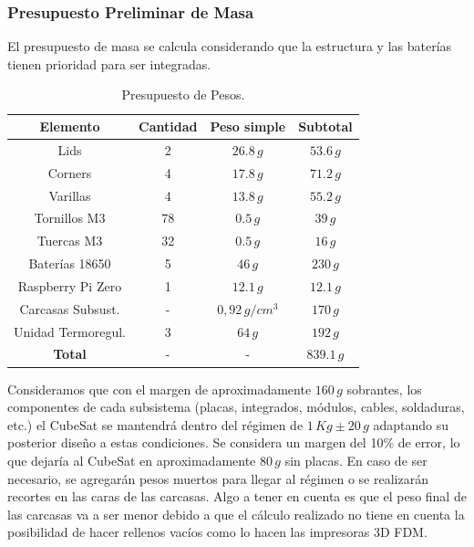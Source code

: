     \subsubsection{Presupuesto Preliminar de Masa}
      El presupuesto de masa se calcula considerando que la estructura y las baterías tienen prioridad para ser
      integradas.
      \begin{table}[H]
        \centering
        \begin{tabular}{|c|c|c|c|}
          \hline
          \textbf{Elemento} & \textbf{Cantidad} & \textbf{Peso simple}  & \textbf{Subtotal} \\ \hline
          Lids              & 2                 & $26.8 \, g$           & $53.6 \, g$ \\ \hline
          Corners           & 4                 & $17.8 \, g$           & $71.2 \, g$ \\ \hline
          Varillas          & 4                 & $13.8 \, g$           & $55.2 \, g$ \\ \hline
          Tornillos M3      & 78                & $0.5 \, g$            & $39 \, g$ \\ \hline
          Tuercas M3        & 32                & $0.5 \, g$            & $16 \, g$ \\ \hline
          Baterías 18650    & 5                 & $46 \, g$             & $230 \, g$ \\ \hline
          Raspberry Pi Zero & 1                 & $12.1 \,g$            & $12.1 \, g$ \\ \hline
          Carcasas Subsust. & -                 & $0,92 \, g/cm^3$      & $170 \, g$ \\ \hline
          Unidad Termoregul.& 3                 & $64 \, g$             & $192 \, g$ \\ \hline
          \textbf{Total}    & -                 & -                     & $839.1 \, g$ \\ \hline
        \end{tabular}
        \caption{Presupuesto de Pesos.}
      \end{table}

      Consideramos que con el margen de aproximadamente $160 \, g$ sobrantes, los componentes de cada subsistema
      (placas, integrados, módulos, cables, soldaduras, etc.) el CubeSat se mantendrá dentro del régimen de $1 \, Kg \pm
      20 \, g$ adaptando su posterior diseño a estas condiciones. Se considera un margen del 10\% de error, lo que
      dejaría al CubeSat en aproximadamente $80 \, g$ sin placas. En caso de ser necesario, se agregarán pesos
      muertos para llegar al régimen o se realizarán recortes en las caras de las carcasas. Algo a tener en cuenta es
      que el peso final de las carcasas va a ser menor debido a que el cálculo realizado no tiene en cuenta la
      posibilidad de hacer rellenos vacíos como lo hacen las impresoras 3D FDM.

